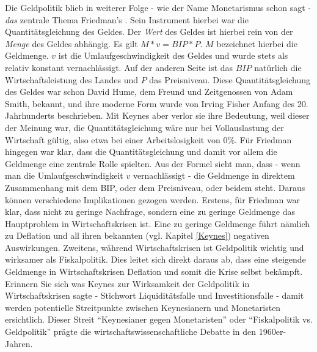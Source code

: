 Die Geldpolitik blieb in weiterer Folge - wie der Name Monetarismus schon sagt - \textit{das} zentrale Thema Friedman's \parencite{Friedman1968}. Sein Instrument hierbei war die Quantitätsgleichung des Geldes. Der \textit{Wert} des Geldes ist hierbei rein von der \textit{Menge} des Geldes abhängig. Es gilt $ M * v = BIP * P$. $M$ bezeichnet hierbei die Geldmenge. $v$ ist die Umlaufgeschwindigkeit des Geldes und wurde stets als relativ konstant vernachlässigt. Auf der anderen Seite ist das $BIP$ natürlich die Wirtschaftsleistung des Landes und $P$ das Preisniveau. Diese Quantitätsgleichung des Geldes war schon David Hume, dem Freund und Zeitgenossen von Adam Smith, bekannt, und ihre moderne Form wurde von Irving Fisher \parencite{Fisher1911} Anfang des 20. Jahrhunderts beschrieben. Mit Keynes aber verlor sie ihre Bedeutung, weil dieser der Meinung war, die Quantitätsgleichung wäre nur bei Vollauslastung der Wirtschaft gültig, also etwa bei einer Arbeitslosigkeit von 0\%.
Für Friedman hingegen war klar, dass die Quantitätsgleichung und damit vor allem die Geldmenge eine zentrale Rolle spielten. Aus der Formel sieht man, dass - wenn man die Umlaufgeschwindigkeit $v$ vernachlässigt - die Geldmenge in direktem Zusammenhang mit dem BIP, oder dem Preisniveau, oder beidem steht. Daraus können verschiedene Implikationen gezogen werden. 
Erstens, für Friedman war klar, dass nicht zu geringe Nachfrage, sondern eine zu geringe Geldmenge das Hauptproblem in Wirtschaftskrisen ist. Eine zu geringe Geldmenge führt nämlich zu Deflation und all ihren bekannten (vgl. Kapitel \ref{Keynes}) negativen Auswirkungen.
Zweitens, während Wirtschaftskrisen ist Geldpolitik wichtig und wirksamer als Fiskalpolitik. Dies leitet sich direkt daraus ab, dass eine steigende Geldmenge in Wirtschaftskrisen Deflation und somit die Krise selbst bekämpft. Erinnern Sie sich was Keynes zur Wirksamkeit der Geldpolitik in Wirtschaftskrisen sagte - Stichwort Liquiditätsfalle und Investitionsfalle - damit werden potentielle Streitpunkte zwischen Keynesianern und Monetaristen ersichtlich. Dieser Streit "`Keynesianer gegen Monetaristen"' oder "`Fiskalpolitik vs. Geldpolitik"' prägte die wirtschaftswissenschaftliche Debatte in den 1960er-Jahren. 

